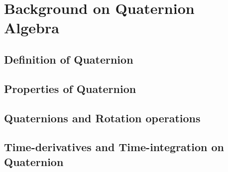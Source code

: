 \chapter{Background on Quaternion Algebra}
\label{chap:background}

\section{Definition of Quaternion}
\label{sec:def_of_quat}

\section{Properties of Quaternion}
\label{sec:prop_of_quat}

\section{Quaternions and Rotation operations}
\label{sec:quat_and_rot}

\section{Time-derivatives and Time-integration on Quaternion}
\label{sec:time_on_quat}
